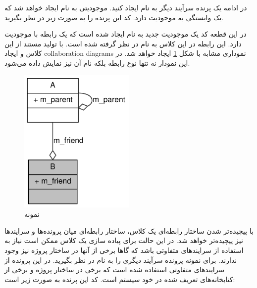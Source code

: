 در ادامه یک پرنده سرآیند دیگر به نام  ایجاد کنید. موجودیتی به
نام  ایجاد خواهد شد که یک وابستگی به موجودیت  دارد. کد این پرنده را
به صورت زیر در نظر بگیرید.


در این قطعه کد یک موجودیت جدید به نام  ایجاد شده است که یک رابطه با
موجودیت  دارد. این رابطه در این کلاس به نام  در نظر گرفته
شده است. با تولید مستند از این کلاس و ایجاد \glspl{collaboration diagram}
نموداری مشابه با شکل \ref{image/write/graph/example/class_b__coll__graph} ایجاد
خواهد شد. در این نمودار نه تنها نوع رابطه بلکه نام آن نیز نمایش داده می‌شود.

\begin{figure}
	\centering
	\includegraphics[width=0.5\textwidth]{image/write/graph/example/class_b__coll__graph}
	\caption[نمونه]{
		نمونه
	}
	\label{image/write/graph/example/class_b__coll__graph}
\end{figure}

با پیچیده‌تر شدن ساختار رابطه‌ای یک کلاس، ساختار رابطه‌ای میان پرونده‌ها و
سرایندها نیز پیچیده‌تر خواهد شد. در این حالت برای پیاده سازی یک کلاس ممکن است
نیاز به استفاده از سرایندهای متفاوتی باشد که گاها برخی از آنها در ساختار پروژه
نیز وجود ندارند.
برای نمونه پرونده سرآیند دیگری را به نام  در نظر بگیرید. در این
پرونده از سرایندهای متفاوتی استفاده شده است که برخی در ساختار پروژه و برخی از
کتابخانه‌های تعریف شده در خود سیستم است. کد این پرنده به صورت زیر است:

